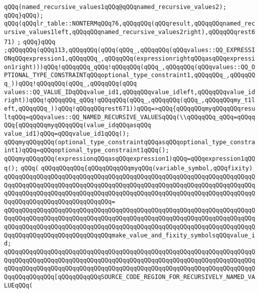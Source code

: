 \verb|qQQq(named_recursive_values1qQQq@qQQqnamed_recursive_values2);|\newline
\verb|qQQq}qQQq);|\newline
\verb|qQQq(qQQqlr_table::NONTERMqQQq76,qQQqqQQq(qQQqresult,qQQqqQQqnamed_recursive_values1left,qQQqqQQqnamed_recursive_values2right),qQQqqQQqrest671)|\newline
\verb|;|\newline
\verb|qQQq}qQQq|\newline
\verb|;qQQqqQQq(qQQq113,qQQqqQQq(qQQq(qQQq_,qQQqqQQq(qQQqvalues::QQ_EXPRESSIONqQQqexpression1,qQQqqQQq_,qQQqqQQq(expressionrightqQQqasqQQqexpression1right)))qQQq!qQQqqQQq_qQQq!qQQqqQQq(qQQq_,qQQqqQQq(qQQqvalues::QQ_OPTIONAL_TYPE_CONSTRAINTqQQqoptional_type_constraint1,qQQqqQQq_,qQQqqQQq_))qQQq!qQQqqQQq(qQQq_,qQQqqQQq(qQQq|\newline
\verb|values::QQ_VALUE_IDqQQqvalue_id1,qQQqqQQqvalue_idleft,qQQqqQQqvalue_idright))qQQq!qQQqqQQq_qQQq!qQQqqQQq(qQQq_,qQQqqQQq(qQQq_,qQQqqQQqmy_t1left,qQQqqQQq_))qQQq!qQQqqQQqrest671))qQQq=>qQQq{qQQqqQQqmyqQQqqQQqresultqQQq=qQQqvalues::QQ_NAMED_RECURSIVE_VALUESqQQq(\\qQQqqQQq_qQQq=qQQqqQQq{qQQqqQQqmyqQQqqQQq(value_idqQQqasqQQq|\newline
\verb|value_id1)qQQq=qQQqvalue_id1qQQq();|\newline
\verb|qQQqmyqQQqqQQq(optional_type_constraintqQQqasqQQqoptional_type_constraint1)qQQq=qQQqoptional_type_constraint1qQQq();|\newline
\verb|qQQqmyqQQqqQQq(expressionqQQqasqQQqexpression1)qQQq=qQQqexpression1qQQq();|\newline
\verb|qQQq(|\newline
\verb|qQQqqQQqqQQq{qQQqqQQqqQQqmyqQQq(variable_symbol,qQQqfixity)|\newline
\verb|qQQqqQQqqQQqqQQqqQQqqQQqqQQqqQQqqQQqqQQqqQQqqQQqqQQqqQQqqQQqqQQqqQQqqQQqqQQqqQQqqQQqqQQqqQQqqQQqqQQqqQQqqQQqqQQqqQQqqQQqqQQqqQQqqQQqqQQqqQQqqQQqqQQqqQQqqQQqqQQqqQQqqQQqqQQqqQQqqQQqqQQqqQQqqQQqqQQqqQQqqQQqqQQqqQQqqQQqqQQqqQQqqQQqqQQqqQQqqQQq=|\newline
\verb|qQQqqQQqqQQqqQQqqQQqqQQqqQQqqQQqqQQqqQQqqQQqqQQqqQQqqQQqqQQqqQQqqQQqqQQqqQQqqQQqqQQqqQQqqQQqqQQqqQQqqQQqqQQqqQQqqQQqqQQqqQQqqQQqqQQqqQQqqQQqqQQqqQQqqQQqqQQqqQQqqQQqqQQqqQQqqQQqqQQqqQQqqQQqqQQqqQQqqQQqqQQqqQQqqQQqqQQqqQQqqQQqqQQqqQQqqQQqqQQqmake_value_and_fixity_symbolsqQQqvalue_id;|\newline
\newline
\verb|qQQqqQQqqQQqqQQqqQQqqQQqqQQqqQQqqQQqqQQqqQQqqQQqqQQqqQQqqQQqqQQqqQQqqQQqqQQqqQQqqQQqqQQqqQQqqQQqqQQqqQQqqQQqqQQqqQQqqQQqqQQqqQQqqQQqqQQqqQQqqQQqqQQqqQQqqQQqqQQqqQQqqQQqqQQqqQQqqQQqqQQqqQQqqQQqqQQqqQQqqQQqqQQqqQQqqQQqqQQqqQQq[qQQqqQQqqQQqSOURCE_CODE_REGION_FOR_RECURSIVELY_NAMED_VALUEqQQq(|\newline
